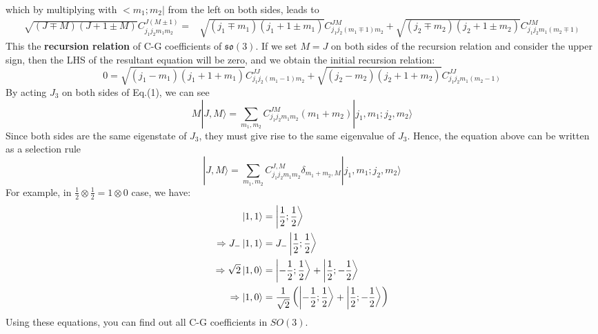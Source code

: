 \documentclass{article}
\begin{document}
	which by multiplying with $< m_{1} ;m_{2}| $ from the left on both sides, leads to
	\begin{equation*}
		\begin{aligned}
			\sqrt{(J\mp M)(J+1\pm M)} C_{j_{1} j_{2} m_{1} m_{2}}^{J(M\pm 1)} = & \sqrt{( j_{1} \mp m_{1})( j_{1} +1\pm m_{1})} C_{j_{1} j_{2}( m_{1} \mp 1) m_{2}}^{JM} +\sqrt{( j_{2} \mp m_{2})( j_{2} +1\pm m_{2})} C_{j_{1} j_{2} m_{1}( m_{2} \mp 1)}^{JM}
		\end{aligned}
	\end{equation*}
	This the \textbf{recursion relation} of C-G coefficients of $\mathfrak{so}( 3)$. If we set $M=J$ on both sides of the recursion relation and consider the upper sign, then the LHS of the resultant equation will be zero, and we obtain the initial recursion relation:
	\begin{equation*}
		0=\sqrt{( j_{1} -m_{1})( j_{1} +1+m_{1})} C_{j_{1} j_{2}( m_{1} -1) m_{2}}^{JJ} +\sqrt{( j_{2} -m_{2})( j_{2} +1+m_{2})} C_{j_{1} j_{2} m_{1}( m_{2} -1)}^{JJ}
	\end{equation*}
	By acting $J_{3}$ on both sides of Eq.(1), we can see
	\begin{equation*}
		M|J,M\rangle  =\sum _{m_{1} ,m_{2}} C_{j_{1} j_{2} m_{1} m_{2}}^{JM}( m_{1} +m_{2})| j_{1} ,m_{1} ;j_{2} ,m_{2}\rangle 
	\end{equation*}
	Since both sides are the same eigenstate of $J_{3}$, they must give rise to the same eigenvalue of $J_{3}$. Hence, the equation above can be written as a selection rule
	\begin{equation*}
		|J,M\rangle  =\sum _{m_{1} ,m_{2}} C_{j_{1} j_{2} m_{1} m_{2}}^{J,M} \delta _{m_{1} +m_{2} ,M}| j_{1} ,m_{1} ;j_{2} ,m_{2}\rangle 
	\end{equation*}
	For example, in $\frac{1}{2} \otimes \frac{1}{2} =1\otimes 0$ case, we have:
	\begin{equation*}
		\begin{aligned}
			\ket{1,1} & =\ket{\frac{1}{2} ;\frac{1}{2}}\\
			\Rightarrow J_{-}\ket{1,1} & =J_{-}\ket{\frac{1}{2} ;\frac{1}{2}}\\
			\Rightarrow \sqrt{2}\ket{1,0} & =\ket{-\frac{1}{2} ;\frac{1}{2}} +\ket{\frac{1}{2} ;-\frac{1}{2}}\\
			\Rightarrow \ket{1,0} & =\frac{1}{\sqrt{2}}\left(\ket{-\frac{1}{2} ;\frac{1}{2}} +\ket{\frac{1}{2} ;-\frac{1}{2}}\right)
		\end{aligned}
	\end{equation*}
	Using these equations, you can find out all C-G coefficients in $SO( 3)$. 
\end{document}
